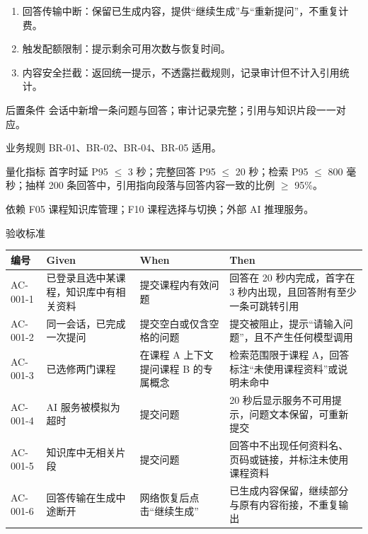\documentclass[12pt,a4paper]{ctexart}
\newenvironment{reqcard}
  {\begin{description}[leftmargin=6.2em,style=nextline,itemsep=4pt]}
  {\end{description}}
\begin{document}
\begin{reqcard}
\begin{enumerate}[label=E\arabic*,leftmargin=2.6em]
      \item 回答传输中断：保留已生成内容，提供“继续生成”与“重新提问”，不重复计费。
      \item 触发配额限制：提示剩余可用次数与恢复时间。
      \item 内容安全拦截：返回统一提示，不透露拦截规则，记录审计但不计入引用统计。
    \end{enumerate}
  \item[后置条件] 会话中新增一条问题与回答；审计记录完整；引用与知识片段一一对应。
  \item[业务规则] BR-01、BR-02、BR-04、BR-05 适用。
  \item[量化指标] 首字时延 P95 $\leq$ 3 秒；完整回答 P95 $\leq$ 20 秒；检索 P95 $\leq$ 800 毫秒；抽样 200 条回答中，引用指向段落与回答内容一致的比例 $\geq$ 95\%。
  \item[依赖] F05 课程知识库管理；F10 课程选择与切换；外部 AI 推理服务。
  \item[验收标准]
\end{reqcard}

\begin{longtable}{@{}C{2.1cm}L{4.2cm}L{4.4cm}L{4.0cm}@{}}
  \toprule
  \textbf{编号} & \textbf{Given} & \textbf{When} & \textbf{Then} \\
  \midrule
  \endhead
  AC-001-1 & 已登录且选中某课程，知识库中有相关资料 & 提交课程内有效问题 & 回答在 20 秒内完成，首字在 3 秒内出现，且回答附有至少一条可跳转引用 \\
  AC-001-2 & 同一会话，已完成一次提问 & 提交空白或仅含空格的问题 & 提交被阻止，提示“请输入问题”，且不产生任何模型调用 \\
  AC-001-3 & 已选修两门课程 & 在课程 A 上下文提问课程 B 的专属概念 & 检索范围限于课程 A，回答标注“未使用课程资料”或说明未命中 \\
  AC-001-4 & AI 服务被模拟为超时 & 提交问题 & 20 秒后显示服务不可用提示，问题文本保留，可重新提交 \\
  AC-001-5 & 知识库中无相关片段 & 提交问题 & 回答中不出现任何资料名、页码或链接，并标注未使用课程资料 \\
  AC-001-6 & 回答传输在生成中途断开 & 网络恢复后点击“继续生成” & 已生成内容保留，继续部分与原有内容衔接，不重复输出 \\
  \bottomrule
\end{longtable}
\end{document}
